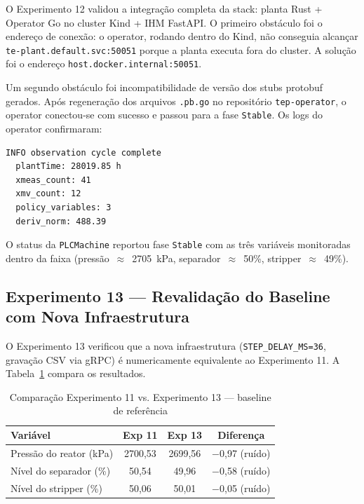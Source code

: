 O Experimento 12 validou a integração completa da stack: planta Rust + Operator Go no cluster Kind + IHM FastAPI. O primeiro obstáculo foi o endereço de conexão: o operator, rodando dentro do Kind, não conseguia alcançar \texttt{te-plant.default.svc:50051} porque a planta executa fora do cluster. A solução foi o endereço \texttt{host.docker.internal:50051}.

Um segundo obstáculo foi incompatibilidade de versão dos stubs protobuf gerados. Após regeneração dos arquivos \texttt{.pb.go} no repositório \texttt{tep-operator}, o operator conectou-se com sucesso e passou para a fase \texttt{Stable}. Os logs do operator confirmaram:

\begin{lstlisting}[float=htbp, label={lst:operator_log}, caption={Log do \texttt{tep-operator} após conectividade estabelecida (Experimento 12)}]
INFO observation cycle complete
  plantTime: 28019.85 h
  xmeas_count: 41
  xmv_count: 12
  policy_variables: 3
  deriv_norm: 488.39
\end{lstlisting}

O status da \texttt{PLCMachine} reportou fase \texttt{Stable} com as três variáveis monitoradas dentro da faixa (pressão~$\approx$~2705~kPa, separador~$\approx$~50\%, stripper~$\approx$~49\%).

\subsection{Experimento 13 — Revalidação do Baseline com Nova Infraestrutura}

O Experimento 13 verificou que a nova infraestrutura (\texttt{STEP\_DELAY\_MS=36}, gravação CSV via gRPC) é numericamente equivalente ao Experimento 11. A Tabela~\ref{tab:exp13} compara os resultados.

\begin{table}[ht!]
\centering
\caption{Comparação Experimento 11 vs. Experimento 13 — baseline de referência}
\label{tab:exp13}
\begin{tabular}{|l|c|c|c|}
\hline
\textbf{Variável} & \textbf{Exp 11} & \textbf{Exp 13} & \textbf{Diferença} \\
\hline
Pressão do reator (kPa)    & 2700,53 & 2699,56 & $-$0,97 (ruído) \\
Nível do separador (\%)    & 50,54   & 49,96   & $-$0,58 (ruído) \\
Nível do stripper (\%)     & 50,06   & 50,01   & $-$0,05 (ruído) \\
\hline
\end{tabular}
\end{table}

